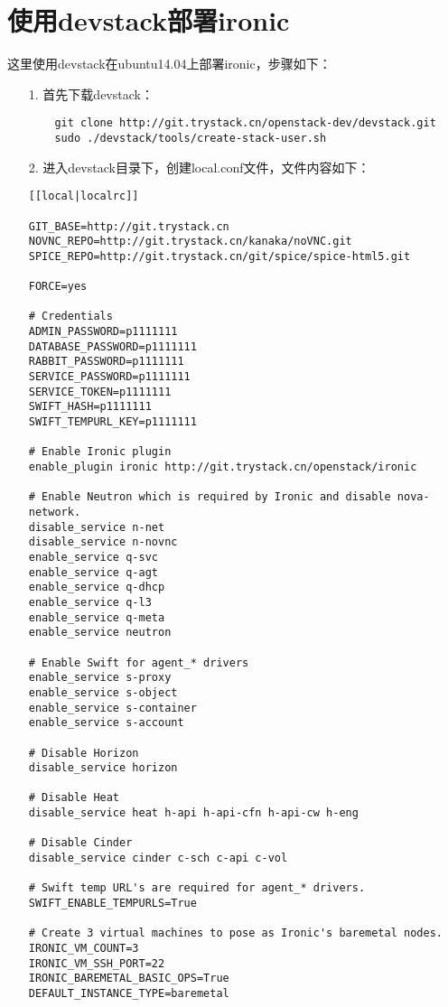 \documentclass[a4paper,left=1.5cm,right=1.5cm,11pt]{article}
\begin{document}
\tableofcontents

\clearpage

\section{使用devstack部署ironic}
	这里使用devstack在ubuntu14.04上部署ironic，步骤如下：
	\begin{itemize}
		\item[1.] 首先下载devstack：
		\begin{lstlisting}
	git clone http://git.trystack.cn/openstack-dev/devstack.git
	sudo ./devstack/tools/create-stack-user.sh
		\end{lstlisting}

		\item[2.] 进入devstack目录下，创建local.conf文件，文件内容如下：
		\begin{lstlisting}
[[local|localrc]]

GIT_BASE=http://git.trystack.cn
NOVNC_REPO=http://git.trystack.cn/kanaka/noVNC.git
SPICE_REPO=http://git.trystack.cn/git/spice/spice-html5.git

FORCE=yes

# Credentials
ADMIN_PASSWORD=p1111111
DATABASE_PASSWORD=p1111111
RABBIT_PASSWORD=p1111111
SERVICE_PASSWORD=p1111111
SERVICE_TOKEN=p1111111
SWIFT_HASH=p1111111
SWIFT_TEMPURL_KEY=p1111111

# Enable Ironic plugin
enable_plugin ironic http://git.trystack.cn/openstack/ironic

# Enable Neutron which is required by Ironic and disable nova-network.
disable_service n-net
disable_service n-novnc
enable_service q-svc
enable_service q-agt
enable_service q-dhcp
enable_service q-l3
enable_service q-meta
enable_service neutron

# Enable Swift for agent_* drivers
enable_service s-proxy
enable_service s-object
enable_service s-container
enable_service s-account

# Disable Horizon
disable_service horizon

# Disable Heat
disable_service heat h-api h-api-cfn h-api-cw h-eng

# Disable Cinder
disable_service cinder c-sch c-api c-vol

# Swift temp URL's are required for agent_* drivers.
SWIFT_ENABLE_TEMPURLS=True

# Create 3 virtual machines to pose as Ironic's baremetal nodes.
IRONIC_VM_COUNT=3
IRONIC_VM_SSH_PORT=22
IRONIC_BAREMETAL_BASIC_OPS=True
DEFAULT_INSTANCE_TYPE=baremetal


\end{lstlisting}
\end{itemize}
\end{document}
